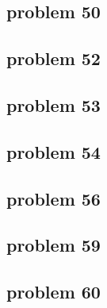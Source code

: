 \subsection{problem 50}


\subsection{problem 52}


\subsection{problem 53}


\subsection{problem 54}


\subsection{problem 56}


\subsection{problem 59}


\subsection{problem 60}
